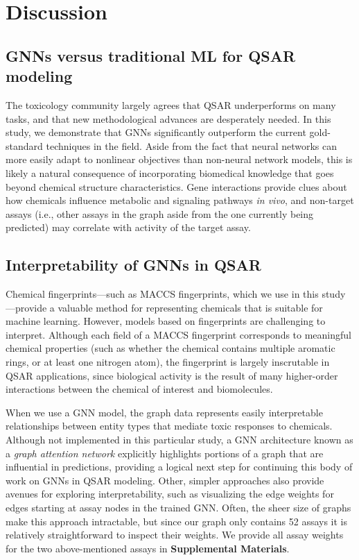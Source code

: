 \documentclass{ws-procs11x85}
\begin{document}
\section{Discussion}

\subsection{GNNs versus traditional ML for QSAR modeling}
The toxicology community largely agrees that QSAR underperforms on many tasks, and that new methodological advances are desperately needed.
In this study, we demonstrate that GNNs significantly outperform the current gold-standard techniques in the field.
Aside from the fact that neural networks can more easily adapt to nonlinear objectives than non-neural network models, this is likely a natural consequence of incorporating biomedical knowledge that goes beyond chemical structure characteristics.
Gene interactions provide clues about how chemicals influence metabolic and signaling pathways \textit{in vivo}, and non-target assays (i.e., other assays in the graph aside from the one currently being predicted) may correlate with activity of the target assay.

\subsection{Interpretability of GNNs in QSAR}
Chemical fingerprints---such as MACCS fingerprints, which we use in this study---provide a valuable method for representing chemicals that is suitable for machine learning.
However, models based on fingerprints are challenging to interpret.
Although each field of a MACCS fingerprint corresponds to meaningful chemical properties (such as whether the chemical contains multiple aromatic rings, or at least one nitrogen atom), the fingerprint is largely inscrutable in QSAR applications, since biological activity is the result of many higher-order interactions between the chemical of interest and biomolecules.

When we use a GNN model, the graph data represents easily interpretable relationships between entity types that mediate toxic responses to chemicals.
Although not implemented in this particular study, a GNN architecture known as a \textit{graph attention network} explicitly highlights portions of a graph that are influential in predictions, providing a logical next step for continuing this body of work on GNNs in QSAR modeling.
Other, simpler approaches also provide avenues for exploring interpretability, such as visualizing the edge weights for edges starting at assay nodes in the trained GNN.
Often, the sheer size of graphs make this approach intractable, but since our graph only contains 52 assays it is relatively straightforward to inspect their weights. We provide all assay weights for the two above-mentioned assays in \textbf{Supplemental Materials}.
\end{document}
